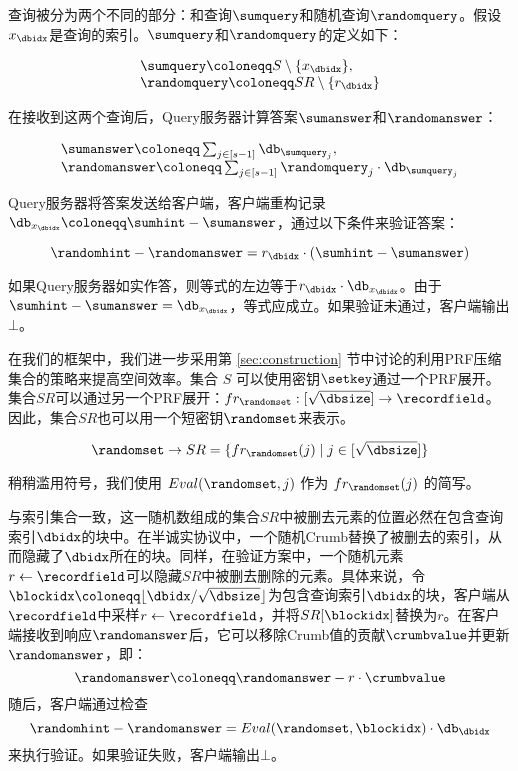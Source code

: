 查询被分为两个不同的部分：和查询$\sumquery$和随机查询$\randomquery$。假设$x_\dbidx$是查询的索引。$\sumquery$和$\randomquery$的定义如下：

$$
    \begin{array}{l}
        \sumquery \coloneqq  S \setminus \{x_\dbidx\}, \\
        \randomquery \coloneqq  SR \setminus \{r_\dbidx\}
    \end{array}
$$

在接收到这两个查询后，Query服务器计算答案$\sumanswer$和$\randomanswer$：

$$
    \begin{array}{l}
        \sumanswer \coloneqq  \sum_{j \in [s-1]} \db_{\sumquery_j}, \\
        \randomanswer \coloneqq  \sum_{j \in [s-1]} \randomquery_j\cdot \db_{\sumquery_j}
    \end{array}
$$

Query服务器将答案发送给客户端，客户端重构记录$\db_{x_\dbidx} \coloneqq \sumhint-\sumanswer$，通过以下条件来验证答案：

$$
    \randomhint-\randomanswer = r_\dbidx \cdot (\sumhint-\sumanswer)
$$

如果Query服务器如实作答，则等式的左边等于$r_{\dbidx} \cdot \db_{x_\dbidx}$。由于$\sumhint - \sumanswer = \db_{x_\dbidx}$，等式应成立。如果验证未通过，客户端输出 $\bot$。

在我们的框架中，我们进一步采用第 \ref{sec:construction} 节中讨论的利用PRF压缩集合的策略来提高空间效率。集合 $S$ 可以使用密钥$\setkey$通过一个PRF展开。集合$SR$可以通过另一个PRF展开：$fr_{\randomset}: [\sqrt{\dbsize}] \to \recordfield$。因此，集合$SR$也可以用一个短密钥$\randomset$来表示。

$$
    \randomset \to SR = \{fr_{\randomset}(j) \mid j\in[\sqrt{\dbsize}]\}
$$

稍稍滥用符号，我们使用 $Eval(\randomset, j)$ 作为 $fr_{\randomset}(j)$ 的简写。

与索引集合一致，这一随机数组成的集合$SR$中被删去元素的位置必然在包含查询索引$\dbidx$的块中。在半诚实协议中，一个随机Crumb替换了被删去的索引，从而隐藏了$\dbidx$所在的块。同样，在验证方案中，一个随机元素$r \leftarrow \recordfield$可以隐藏$SR$中被删去删除的元素。具体来说，令$\blockidx \coloneqq \lfloor \dbidx /\sqrt{\dbsize} \rfloor$为包含查询索引$\dbidx$的块，客户端从$\recordfield$中采样$r \leftarrow \recordfield$，并将$SR[\blockidx]$替换为$r$。在客户端接收到响应$\randomanswer$后，它可以移除Crumb值的贡献$\crumbvalue$并更新$\randomanswer$，即：
$$\randomanswer \coloneqq \randomanswer - r\cdot \crumbvalue$$
随后，客户端通过检查
$$\randomhint-\randomanswer = Eval(\randomset,\blockidx)\cdot \db_{\dbidx}$$
来执行验证。如果验证失败，客户端输出$\bot$。

